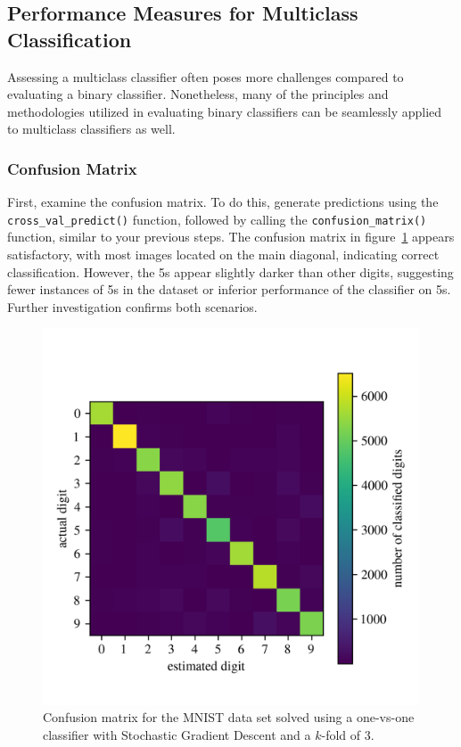 \documentclass[12pt,letter]{article}
\begin{document}
\subsection{Performance Measures for Multiclass Classification}


Assessing a multiclass classifier often poses more challenges compared to evaluating a binary classifier. Nonetheless, many of the principles and methodologies utilized in evaluating binary classifiers can be seamlessly applied to multiclass classifiers as well.


\subsubsection{Confusion Matrix}




First, examine the confusion matrix. To do this, generate predictions using the \texttt{cross\_val\_\allowbreak predict()} function, followed by calling the \texttt{confusion\_matrix()} function, similar to your previous steps. The confusion matrix in figure~\ref{fig:digit_confusion_matrix} appears satisfactory, with most images located on the main diagonal, indicating correct classification. However, the 5s appear slightly darker than other digits, suggesting fewer instances of 5s in the dataset or inferior performance of the classifier on 5s. Further investigation confirms both scenarios.




\begin{figure}[H]
    \centering
    \includegraphics[width=4.4in]{../figures/digit_confusion_matrix.png}
	\vspace{-2ex}
    \caption{Confusion matrix for the MNIST data set solved using a one-vs-one classifier with Stochastic Gradient Descent and a $k$-fold of 3.}
    \label{fig:digit_confusion_matrix}
\end{figure}
\end{document}

